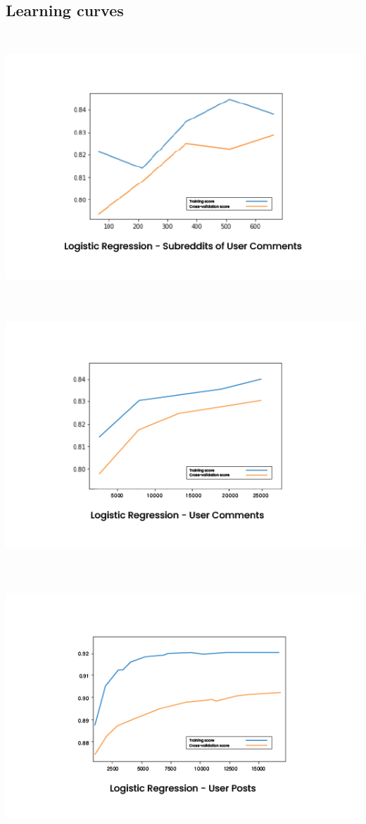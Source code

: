 \documentclass{article}
\begin{document}
    \subsection{Learning curves}
    \includegraphics[width=15cm, height=10cm]{1}\\
    \includegraphics[width=15cm, height=10cm]{2}\\ \\ 
    \includegraphics[width=13.5cm, height=9cm]{3}\\
\end{document}
